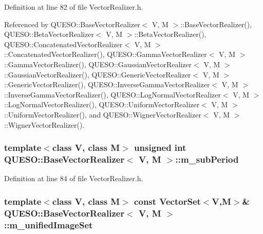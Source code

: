 Definition at line 82 of file Vector\-Realizer.\-h.



Referenced by Q\-U\-E\-S\-O\-::\-Base\-Vector\-Realizer$<$ V, M $>$\-::\-Base\-Vector\-Realizer(), Q\-U\-E\-S\-O\-::\-Beta\-Vector\-Realizer$<$ V, M $>$\-::\-Beta\-Vector\-Realizer(), Q\-U\-E\-S\-O\-::\-Concatenated\-Vector\-Realizer$<$ V, M $>$\-::\-Concatenated\-Vector\-Realizer(), Q\-U\-E\-S\-O\-::\-Gamma\-Vector\-Realizer$<$ V, M $>$\-::\-Gamma\-Vector\-Realizer(), Q\-U\-E\-S\-O\-::\-Gaussian\-Vector\-Realizer$<$ V, M $>$\-::\-Gaussian\-Vector\-Realizer(), Q\-U\-E\-S\-O\-::\-Generic\-Vector\-Realizer$<$ V, M $>$\-::\-Generic\-Vector\-Realizer(), Q\-U\-E\-S\-O\-::\-Inverse\-Gamma\-Vector\-Realizer$<$ V, M $>$\-::\-Inverse\-Gamma\-Vector\-Realizer(), Q\-U\-E\-S\-O\-::\-Log\-Normal\-Vector\-Realizer$<$ V, M $>$\-::\-Log\-Normal\-Vector\-Realizer(), Q\-U\-E\-S\-O\-::\-Uniform\-Vector\-Realizer$<$ V, M $>$\-::\-Uniform\-Vector\-Realizer(), and Q\-U\-E\-S\-O\-::\-Wigner\-Vector\-Realizer$<$ V, M $>$\-::\-Wigner\-Vector\-Realizer().

\hypertarget{class_q_u_e_s_o_1_1_base_vector_realizer_aeddb6129f2810fef48b4e00daa5cea7b}{
\subsubsection[{m\-\_\-sub\-Period}]{\setlength{\rightskip}{0pt plus 5cm}template$<$class V, class M$>$ unsigned int {\bf Q\-U\-E\-S\-O\-::\-Base\-Vector\-Realizer}$<$ V, M $>$\-::m\-\_\-sub\-Period\hspace{0.3cm}{\ttfamily [protected]}}}\label{class_q_u_e_s_o_1_1_base_vector_realizer_aeddb6129f2810fef48b4e00daa5cea7b}


Definition at line 84 of file Vector\-Realizer.\-h.

\hypertarget{class_q_u_e_s_o_1_1_base_vector_realizer_a6c705235d28a3c12641da57cde948872}{
\subsubsection[{m\-\_\-unified\-Image\-Set}]{\setlength{\rightskip}{0pt plus 5cm}template$<$class V, class M$>$ const {\bf Vector\-Set}$<$V,M$>$\& {\bf Q\-U\-E\-S\-O\-::\-Base\-Vector\-Realizer}$<$ V, M $>$\-::m\-\_\-unified\-Image\-Set\hspace{0.3cm}{\ttfamily [protected]}}}\label{class_q_u_e_s_o_1_1_base_vector_realizer_a6c705235d28a3c12641da57cde948872}


